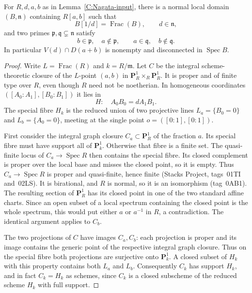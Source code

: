 \begin{lemma}\label{C:Goldman-branches}
For $R,d,a,b$ as in Lemma~\ref{C:Nagata-input}, there is a normal
local domain $(B,\mathfrak n)$ containing $R[a,b]$ such that
\[
 B[1/d]=\operatorname{Frac}(B),\qquad d\in\mathfrak n,
\]
and two primes $\mathfrak p,\mathfrak q\subsetneq\mathfrak n$ satisfy
\[
 b\in\mathfrak p,\quad a\notin\mathfrak p,
 \qquad a\in\mathfrak q,\quad b\notin\mathfrak q.
\]
In particular $V(d)\cap D(a+b)$ is nonempty and disconnected in
$\operatorname{Spec}B$.
\end{lemma}
\begin{proof}
Write $L=\operatorname{Frac}(R)$ and $k=R/\mathfrak m$. Let $C$ be
the integral scheme-theoretic closure of the $L$-point $(a,b)$ in
$\mathbf P^1_R\times_R\mathbf P^1_R$. It is proper and of finite
type over $R$, even though $R$ need not be noetherian. In homogeneous
coordinates $([A_0:A_1],[B_0:B_1])$ it lies in
\[
 H:\quad A_0B_0=d A_1B_1.
\]
The special fibre $H_k$ is the reduced union of two projective lines
$L_a=\{B_0=0\}$ and $L_b=\{A_0=0\}$, meeting at the single point
$o=([0:1],[0:1])$.

First consider the integral graph closure $C_a\subset\mathbf P^1_R$
of the fraction $a$. Its special fibre must have support all of
$\mathbf P^1_k$. Otherwise that fibre is a finite set. The
quasi-finite locus of $C_a\to\operatorname{Spec}R$ then contains
the special fibre. Its closed complement is proper over the local
base and misses the closed point, so it is empty. Thus $C_a\to
\operatorname{Spec}R$ is proper and quasi-finite, hence finite
(Stacks Project, tags~01TI and~02LS). It is birational, and $R$ is
normal, so it is an isomorphism (tag~0AB1). The resulting section of
$\mathbf P^1_R$ has its closed point in one of the two standard
affine charts. Since an open subset of a local spectrum containing
the closed point is the whole spectrum, this would put either
$a$ or $a^{-1}$ in $R$, a contradiction. The identical argument
applies to $C_b$.

The two projections of $C$ have images $C_a,C_b$: each projection
is proper and its image contains the generic point of the respective
integral graph closure. Thus on the special fibre both projections
are surjective onto $\mathbf P^1_k$. A closed subset of $H_k$ with
this property contains both $L_a$ and $L_b$. Consequently $C_k$
has support $H_k$, and in fact $C_k=H_k$ as schemes, since $C_k$
is a closed subscheme of the reduced scheme $H_k$ with full support.


\end{proof}
